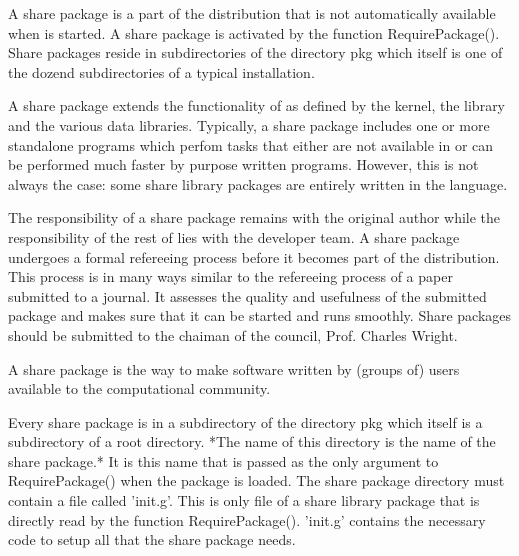 


A {\GAP} share package  is a part of the  {\GAP} distribution that is not
automatically  available  when {\GAP}  is  started.   A  share package is
activated by the function   RequirePackage().  Share packages reside   in
subdirectories  of  the directory pkg which  itself  is one of the dozend
subdirectories of a typical {\GAP} installation.

A share package extends  the functionality of   {\GAP} as defined by  the
{\GAP} kernel,  the   {\GAP}  library  and  the  various  data libraries.
Typically, a share package includes one or more standalone programs which
perfom tasks that either are not available in  {\GAP} or can be performed
much faster by purpose written programs.  However, this is not always the
case:  some share library packages   are entirely  written in the  {\GAP}
language.

The responsibility  of a share package remains   with the original author
while the   responsibility of the rest of   {\GAP} lies  with  the {\GAP}
developer team.  A share   package undergoes a formal refereeing  process
before it becomes  part of the  {\GAP} distribution.  This process is  in
many  ways similar to  the refereeing process  of a  paper submitted to a
journal.  It assesses the quality and usefulness of the submitted package
and makes sure that it can be started  and runs smoothly.  Share packages
should be submitted  to the chaiman of  the {\GAP} council, Prof. Charles
Wright.

A share package is the way to make software written by (groups of) {\GAP}
users available to the computational community.



Every share  package  is in a  subdirectory  of  the directory  pkg which
itself is a  subdirectory of a {\GAP}  root directory.  *The name of this
directory is  the name of  the share  package.* It is  this name  that is
passed  as  the only argument  to  RequirePackage() when  the  package is
loaded.  The share package directory must contain a file called 'init.g'.
This is only file of a share library package that is directly read by the
function RequirePackage().  'init.g'  contains the necessary {\GAP}  code
to setup all that the share package needs.

